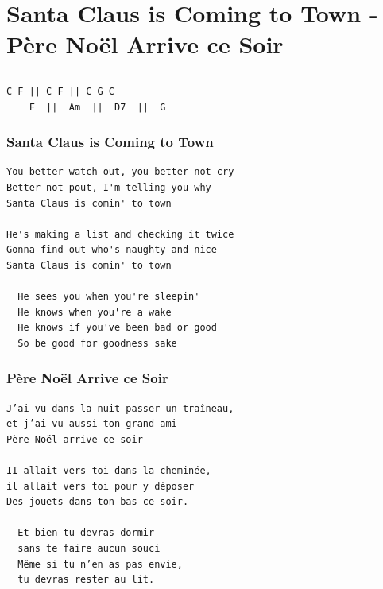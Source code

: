 \documentclass[
]{article}
\begin{document}
\hypertarget{santa-claus-is-coming-to-town---puxe8re-nouxebl-arrive-ce-soir}{%
\section{Santa Claus is Coming to Town - Père Noël Arrive ce
Soir}\label{santa-claus-is-coming-to-town---puxe8re-nouxebl-arrive-ce-soir}}

\hypertarget{section-9}{%
\subsection*{}\label{section-9}}

\begin{verbatim}
C F || C F || C G C
    F  ||  Am  ||  D7  ||  G 
\end{verbatim}

\hypertarget{santa-claus-is-coming-to-town}{%
\subsubsection*{Santa Claus is Coming to
Town}\label{santa-claus-is-coming-to-town}}

\begin{verbatim}
You better watch out, you better not cry
Better not pout, I'm telling you why
Santa Claus is comin' to town

He's making a list and checking it twice
Gonna find out who's naughty and nice
Santa Claus is comin' to town

  He sees you when you're sleepin'
  He knows when you're a wake
  He knows if you've been bad or good
  So be good for goodness sake
\end{verbatim}

\hypertarget{puxe8re-nouxebl-arrive-ce-soir}{%
\subsubsection*{Père Noël Arrive ce
Soir}\label{puxe8re-nouxebl-arrive-ce-soir}}

\begin{verbatim}
J’ai vu dans la nuit passer un traîneau, 
et j’ai vu aussi ton grand ami
Père Noël arrive ce soir

II allait vers toi dans la cheminée, 
il allait vers toi pour y déposer
Des jouets dans ton bas ce soir. 

  Et bien tu devras dormir 
  sans te faire aucun souci
  Même si tu n’en as pas envie,
  tu devras rester au lit.
\end{verbatim}
\end{document}
